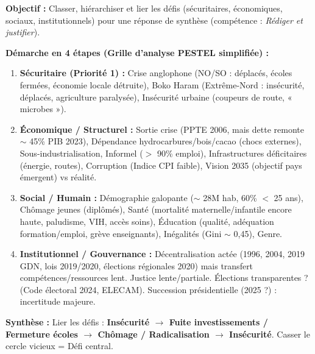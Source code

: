 \documentclass[11pt]{article}
\begin{document}
\begin{methode}
\textbf{Objectif :} Classer, hiérarchiser et lier les défis (sécuritaires, économiques, sociaux, institutionnels) pour une réponse de synthèse (compétence : \emph{Rédiger et justifier}).
\par
\textbf{Démarche en 4 étapes (Grille d'analyse PESTEL simplifiée) :}
\begin{enumerate}
    \item \textbf{Sécuritaire (Priorité 1) :} Crise anglophone (NO/SO : déplacés, écoles fermées, économie locale détruite), Boko Haram (Extrême-Nord : insécurité, déplacés, agriculture paralysée), Insécurité urbaine (coupeurs de route, « microbes »).
    \item \textbf{Économique / Structurel :} Sortie crise (PPTE 2006, mais dette remonte $\sim$ 45\% PIB 2023), Dépendance hydrocarbures/bois/cacao (chocs externes), Sous-industrialisation, Informel ($>$ 90\% emploi), Infrastructures déficitaires (énergie, routes), Corruption (Indice CPI faible), Vision 2035 (objectif pays émergent) vs réalité.
    \item \textbf{Social / Humain :} Démographie galopante ($\sim$ 28M hab, 60\% $<$ 25 ans), Chômage jeunes (diplômés), Santé (mortalité maternelle/infantile encore haute, paludisme, VIH, accès soins), Éducation (qualité, adéquation formation/emploi, grève enseignants), Inégalités (Gini $\sim$ 0,45), Genre.
    \item \textbf{Institutionnel / Gouvernance :} Décentralisation actée (1996, 2004, 2019 GDN, lois 2019/2020, élections régionales 2020) mais transfert compétences/ressources lent. Justice lente/partiale. Élections transparentes ? (Code électoral 2024, ELECAM). Succession présidentielle (2025 ?) : incertitude majeure.
\end{enumerate}
\textbf{Synthèse :} Lier les défis : \textbf{Insécurité $\rightarrow$ Fuite investissements / Fermeture écoles $\rightarrow$ Chômage / Radicalisation $\rightarrow$ Insécurité}. Casser le cercle vicieux = Défi central.
\end{methode}
\end{document}
